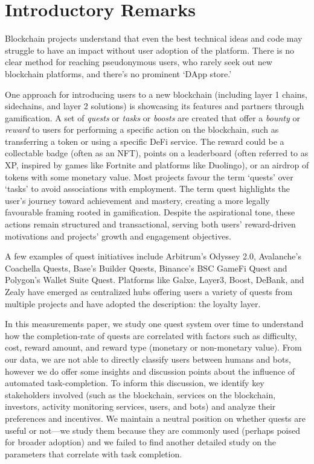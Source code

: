 
\section{Introductory Remarks}

Blockchain projects understand that even the best technical ideas and code may struggle to have an impact without user adoption of the platform. There is no clear method for reaching pseudonymous users, who rarely seek out new blockchain platforms, and there’s no prominent `DApp store.' 

One approach for introducing users to a new blockchain (including layer 1 chains, sidechains, and layer 2 solutions) is showcasing its features and partners through gamification. A set of \textit{quests} or \textit{tasks} or \textit{boosts} are created that offer a \textit{bounty} or \textit{reward} to users for performing a specific action on the blockchain, such as transferring a token or using a specific DeFi service. The reward could be a collectable badge (often as an NFT), points on a leaderboard (often referred to as XP, inspired by games like Fortnite and platforms like Duolingo), or an airdrop of tokens with some monetary value. Most projects favour the term `quests' over `tasks' to avoid associations with employment. The term quest highlights the user's journey toward achievement and mastery, creating a more legally favourable framing rooted in gamification. Despite the aspirational tone, these actions remain structured and transactional, serving both users’ reward-driven motivations and projects’ growth and engagement objectives.

A few examples of quest initiatives include Arbitrum's Odyssey 2.0, Avalanche's Coachella Quests, Base's Builder Quests, Binance's BSC GameFi Quest and Polygon's Wallet Suite Quest. Platforms like Galxe, Layer3, Boost, DeBank, and Zealy have emerged as centralized hubs offering users a variety of quests from multiple projects and have adopted the description: the loyalty layer. 

In this measurements paper, we study one quest system over time to understand how the completion-rate of quests are correlated with factors such as difficulty, cost, reward amount, and reward type (monetary or non-monetary value). From our data, we are not able to directly classify users between humans and bots, however we do offer some insights and discussion points about the influence of automated task-completion. To inform this discussion, we identify key stakeholders involved (such as the blockchain, services on the blockchain, investors, activity monitoring services, users, and bots) and analyze their preferences and incentives. We maintain a neutral position on whether quests are useful or not---we study them because they are commonly used (perhaps poised for broader adoption) and we failed to find another detailed study on the parameters that correlate with task completion. 

